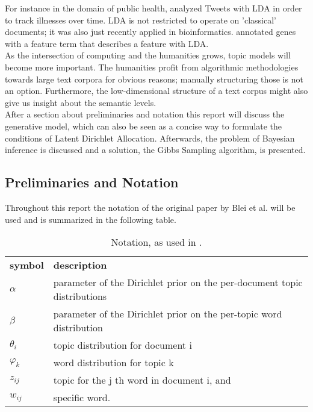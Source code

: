\documentclass[a4paper,ngerman]{atseminar}
\begin{document}
For instance in the domain of public health,\cite{paul2011you} analyzed Tweets with LDA in order 
to track illnesses over time. LDA is not restricted to operate on 'classical' documents; it was also 
just recently applied in bioinformatics. \cite{pinoli2014latent} annotated genes with a feature term 
that describes a feature with LDA.
\\
As the intersection of computing and the humanities grows, topic models will become more important.
The humanities profit from algorithmic methodologies towards large text corpora for obvious reasons;
manually structuring those is not an option. Furthermore, the low-dimensional structure of a text corpus
might also give us insight about the semantic levels.
\\
After a section about preliminaries and notation this report will discuss the generative model, 
which can also be seen as a concise way to formulate the conditions of Latent Dirichlet Allocation.
Afterwards, the problem of Bayesian inference is discussed and a solution, the Gibbs Sampling algorithm, is presented.


\subsection{Preliminaries and Notation}

Throughout this report the notation of the original paper by Blei et al. will be used and 
is summarized in the following table.

\begin{table}[h]
\centering
\caption{Notation, as used in \cite{blei2003latent}.}
\begin{tabular}{l l}
\textbf{symbol} & \textbf{description} \\
 $\alpha$       & parameter of the Dirichlet prior on the per-document topic distributions \\
 $\beta$        & parameter of the Dirichlet prior on the per-topic word distribution \\ 
 $\theta_i$      & topic distribution for document i \\
 $\varphi_k$   & word distribution for topic k \\
 $z_{ij}$         & topic for the j th word in document i, and \\
 $w_{ij}$        & specific word.
  
\end{tabular}
\label{XY:tab:interesting}
\end{table}
\end{document}
